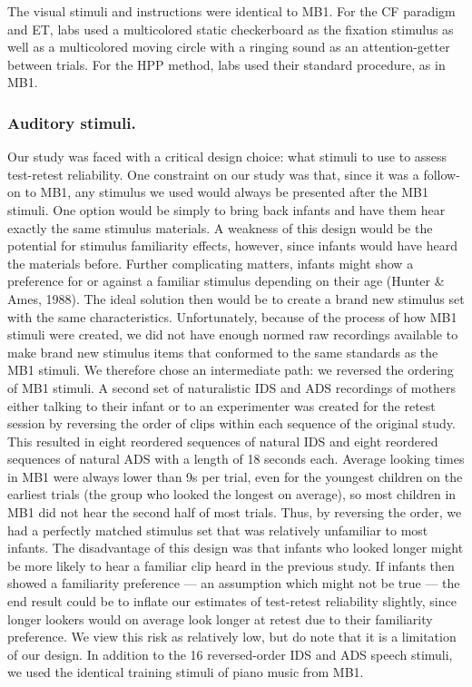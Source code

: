 \documentclass[
  english,
  man,floatsintext]{apa6}
\begin{document}
The visual stimuli and instructions were identical to MB1.
For the CF paradigm and ET, labs used a multicolored static checkerboard as the fixation stimulus as well as a multicolored moving circle with a ringing sound as an attention-getter between trials.
For the HPP method, labs used their standard procedure, as in MB1.

\hypertarget{auditory-stimuli.}{%
\subsubsection{Auditory stimuli.}\label{auditory-stimuli.}}

Our study was faced with a critical design choice: what stimuli to use to assess test-retest reliability.
One constraint on our study was that, since it was a follow-on to MB1, any stimulus we used would always be presented after the MB1 stimuli.
One option would be simply to bring back infants and have them hear exactly the same stimulus materials.
A weakness of this design would be the potential for stimulus familiarity effects, however, since infants would have heard the materials before.
Further complicating matters, infants might show a preference for or against a familiar stimulus depending on their age (Hunter \& Ames, 1988).
The ideal solution then would be to create a brand new stimulus set with the same characteristics.
Unfortunately, because of the process of how MB1 stimuli were created, we did not have enough normed raw recordings available to make brand new stimulus items that conformed to the same standards as the MB1 stimuli.
We therefore chose an intermediate path: we reversed the ordering of MB1 stimuli.
A second set of naturalistic IDS and ADS recordings of mothers either talking to their infant or to an experimenter was created for the retest session by reversing the order of clips within each sequence of the original study.
This resulted in eight reordered sequences of natural IDS and eight reordered sequences of natural ADS with a length of 18 seconds each.
Average looking times in MB1 were always lower than 9s per trial, even for the youngest children on the earliest trials (the group who looked the longest on average), so most children in MB1 did not hear the second half of most trials.
Thus, by reversing the order, we had a perfectly matched stimulus set that was relatively unfamiliar to most infants.
The disadvantage of this design was that infants who looked longer might be more likely to hear a familiar clip heard in the previous study.
If infants then showed a familiarity preference --- an assumption which might not be true --- the end result could be to inflate our estimates of test-retest reliability slightly, since longer lookers would on average look longer at retest due to their familiarity preference.
We view this risk as relatively low, but do note that it is a limitation of our design.
In addition to the 16 reversed-order IDS and ADS speech stimuli, we used the identical training stimuli of piano music from MB1.
\end{document}
